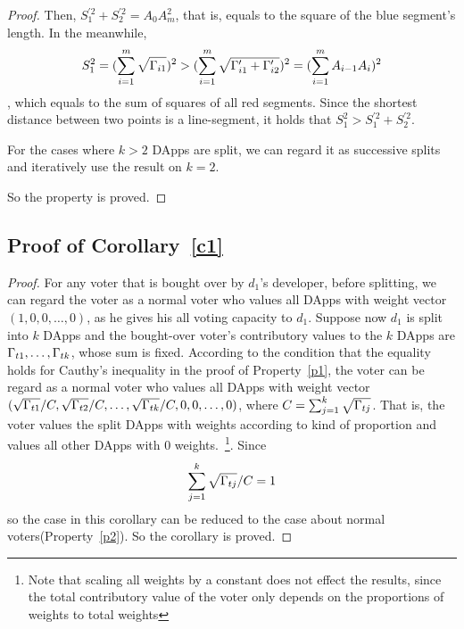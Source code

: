 \begin{proof}
   	Then, $S_1^{'2}+S_2^{'2}=A_0A_m^2$, that is, equals to the square of the blue segment's length. In the meanwhile,
   	 $$S_1^2 = (\sum_{i=1}^m \sqrt{\Gamma_{i1}})^2 > (\sum_{i=1}^m \sqrt{\Gamma'_{i1}+\Gamma'_{i2}})^2 = (\sum_{i=1}^m A_{i-1}A_i)^2$$,
   	 which equals to the sum of squares of all red segments. Since the shortest distance between two points is a line-segment, it holds that $S_1^2 >S_1^{'2}+S_2^{'2}$.

   	 For the cases where $k>2$ DApps are split, 	we can regard it as successive splits and iteratively use the result on $k=2$.

   	 So the property is proved.

\end{proof}

\subsection{Proof of Corollary~\ref{c1}}
\label{subsection:proof3}
\begin{proof}
	For any voter that is bought over by $d_1$'s developer, before splitting, we
	can regard the voter as a normal voter who values all DApps with weight
	vector $(1,0,0,\ldots,0)$, as he gives his all voting capacity to $d_1$.
	Suppose now $d_1$ is split into $k$ DApps and the bought-over voter's
	contributory values to the $k$ DApps are $\Gamma_{t1},\ldots,\Gamma_{tk}$, whose
	sum is fixed. According to the condition that the equality holds for Cauthy's
	inequality in the proof of Property~\ref{p1}, the voter can be regard as a
	normal voter who values all DApps with weight vector
	$(\sqrt{\Gamma_{t1}}/C,\sqrt{\Gamma_{t2}}/C,\ldots, \sqrt{\Gamma_{tk}}/C,0,0,\ldots,0)$, where $C=\sum_{j=1}^k \sqrt{\Gamma_{tj}}$. That is, the voter values the split DApps with weights according to kind of proportion and values all other DApps with 0 weights.~\footnote{Note that scaling all weights by a constant does not effect the results, since the total contributory value of the voter only depends on the proportions of weights to total weights}. Since
		$$\sum_{j=1}^k \sqrt{\Gamma_{tj}}/C =1$$
	so the case in this corollary can be reduced to the case about normal voters(Property~\ref{p2}). So the corollary is proved.
\end{proof}

